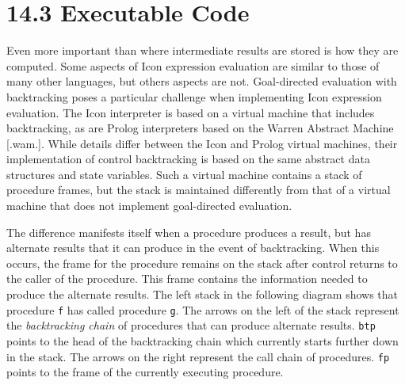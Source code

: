 \section[14.3 Executable Code]{14.3 Executable Code}

Even more important than where intermediate results are stored is how
they are computed. Some aspects of Icon expression evaluation are
similar to those of many other languages, but others aspects are
not. Goal-directed evaluation with backtracking poses a particular
challenge when implementing Icon expression evaluation. The Icon
interpreter is based on a virtual machine that includes backtracking,
as are Prolog interpreters based on the Warren Abstract Machine
[.wam.]. While details differ between the Icon and Prolog virtual
machines, their implementation of control backtracking is based on the
same abstract data structures and state variables. Such a virtual
machine contains a stack of procedure frames, but the stack is
maintained differently from that of a virtual machine that does not
implement goal-directed evaluation.

The difference manifests itself when a procedure produces a result,
but has alternate results that it can produce in the event of
backtracking. When this occurs, the frame for the procedure remains on
the stack after control returns to the caller of the procedure. This
frame contains the information needed to produce the alternate
results. The left stack in the following diagram shows that procedure
\texttt{f} has called procedure \texttt{g}. The arrows on the left of
the stack represent the \textit{backtracking chain} of procedures that
can produce alternate results. \texttt{btp} points to the head of the
backtracking chain which currently starts further down in the
stack. The arrows on the right represent the call chain of procedures.
\texttt{fp} points to the frame of the currently executing procedure.

